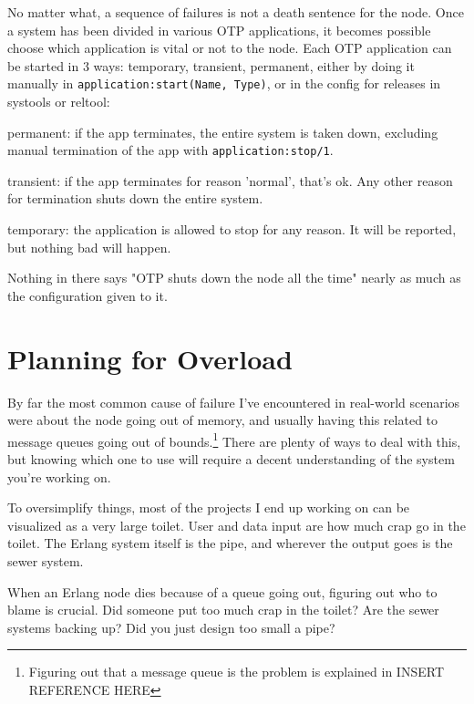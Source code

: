 \documentclass[11pt, oneside]{book}   	%
\newcommand{\function}[1]{\Verb`#1`}
\newcommand{\expression}[1]{\Verb`#1`}
\begin{document}
No matter what, a sequence of failures is not a death sentence for the node. Once a system has been divided in various OTP applications, it becomes possible choose which application is vital or not to the node. Each OTP application can be started in 3 ways: temporary, transient, permanent, either by doing it manually in \expression{application:start(Name, Type)}, or in the config for releases in systools or reltool:

\begin{itemize*}
	\item permanent: if the app terminates, the entire system is taken down, excluding manual termination of the app with \function{application:stop/1}.
	\item transient: if the app terminates for reason 'normal', that's ok. Any other reason for termination shuts down the entire system.
	\item temporary: the application is allowed to stop for any reason. It will be reported, but nothing bad will happen.
\end{itemize*}

Nothing in there says "OTP shuts down the node all the time" nearly as much as the configuration given to it.



\chapter{Planning for Overload}
\label{chap:overload}

By far the most common cause of failure I've encountered in real-world scenarios were about the node going out of memory, and usually having this related to message queues going out of bounds.\footnote{Figuring out that a message queue is the problem is explained in INSERT REFERENCE HERE} There are plenty of ways to deal with this, but knowing which one to use will require a decent understanding of the system you're working on.

To oversimplify things, most of the projects I end up working on can be visualized as a very large toilet. User and data input are how much crap go in the toilet. The Erlang system itself is the pipe, and wherever the output goes is the sewer system.

When an Erlang node dies because of a queue going out, figuring out who to blame is crucial. Did someone put too much crap in the toilet? Are the sewer systems backing up? Did you just design too small a pipe?
\end{document}
